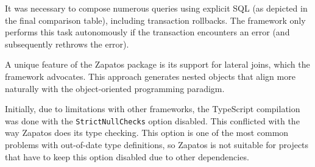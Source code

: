 It was necessary to compose numerous queries using explicit SQL (as depicted in
the final comparison table), including transaction rollbacks. The framework only
performs this task autonomously if the transaction encounters an error (and
subsequently rethrows the error).

A unique feature of the Zapatos package is its support for lateral joins, which
the framework advocates. This approach generates nested objects that align more
naturally with the object-oriented programming paradigm.

Initially, due to limitations with other frameworks, the TypeScript compilation
was done with the \texttt{StrictNullChecks} option disabled. This conflicted
with the way Zapatos does its type checking. This option is one of the most
common problems with out-of-date type definitions, so Zapatos is not suitable
for projects that have to keep this option disabled due to other dependencies.